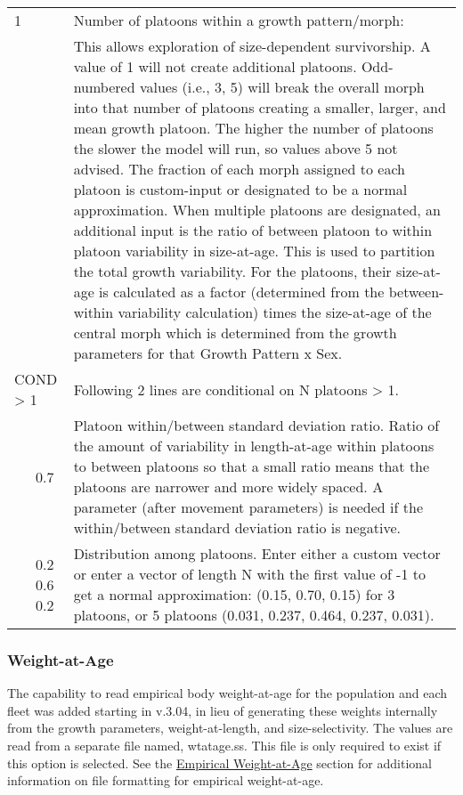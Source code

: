 \begin{center}
\begin{longtable}{p{0.5cm} p{2cm} p{12.5cm}}
		\hline
		1 & & Number of platoons within a growth pattern/morph: \Tstrut\\
		& & This allows exploration of size-dependent survivorship. A value of 1 will not create additional platoons. Odd-numbered values (i.e., 3, 5) will break the overall morph into that number of platoons creating a smaller, larger, and mean growth platoon. The higher the number of platoons the slower the model will run, so values above 5 not advised. The fraction of each morph assigned to each platoon is custom-input or designated to be a normal approximation. When multiple platoons are designated, an additional input is the ratio of between platoon to within platoon variability in size-at-age. This is used to partition the total growth variability. For the platoons, their size-at-age is calculated as a factor (determined from the between-within variability calculation) times the size-at-age of the central morph which is determined from the growth parameters for that Growth Pattern x Sex. \Bstrut\\

		\multicolumn{2}{l}{COND > 1} & \multicolumn{1}{l}{\parbox{12cm}{Following 2 lines are conditional on N platoons > 1.}} \Tstrut\Bstrut\\

		& 0.7 & Platoon within/between standard deviation ratio. Ratio of the amount of variability in length-at-age within platoons to between platoons so that a small ratio means that the platoons are narrower and more widely spaced. A parameter (after movement parameters) is needed if the within/between standard deviation ratio is negative. \Bstrut\\

		& 0.2 0.6 0.2 & Distribution among platoons. Enter either a custom vector or enter a vector of length N with the first value of -1 to get a normal approximation: (0.15, 0.70, 0.15) for 3 platoons, or 5 platoons (0.031, 0.237, 0.464, 0.237, 0.031). \Bstrut\\
		\hline
	\end{longtable}
	\vspace*{-\baselineskip}
\end{center}

\subsubsection{Weight-at-Age}
The capability to read empirical body weight-at-age for the population and each fleet was added starting in v.3.04, in lieu of generating these weights internally from the growth parameters, weight-at-length, and size-selectivity. The values are read from a separate file named, wtatage.ss. This file is only required to exist if this option is selected. See the \hyperlink{WAA}{Empirical Weight-at-Age} section for additional information on file formatting for empirical weight-at-age.

